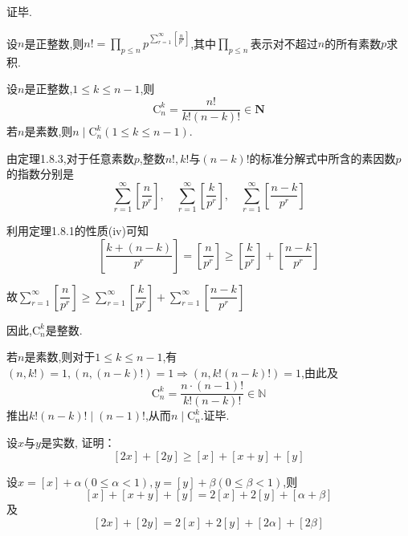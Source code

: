 证毕.

\corollary 设$n$是正整数,则$n !=\displaystyle{\prod_{p \leqslant n}} p^{\mathop{\sum}\limits_{r=1}^{\infty}\left[\frac{n}{p^{r}}\right]}$,其中$\displaystyle{\prod_{p \leqslant n}}$表示对不超过$n$的所有素数$p$求积.

\theorem {\color{red}[定理1.8.4]}设$n$是正整数,$1 \leqslant k \leqslant n-1$,则
\begin{equation}\label{equ1.29}
	\mathrm{C}_{n}^{k}=\frac{n !}{k !(n-k) !} \in \mathbf{N}
\end{equation}
若$n$是素数,则$n \mid \mathrm{C}_{n}^{k}(1 \leqslant k \leqslant n-1)$.

\proof 由定理1.8.3,对于任意素数$p$,整数$n !, k !$与$(n-k) !$的标准分解式中所含的素因数$p$的指数分别是
\begin{equation*}
	\sum_{r=1}^{\infty}\left[\frac{n}{p^{r}}\right], \quad \sum_{r=1}^{\infty}\left[\frac{k}{p^{r}}\right], \quad \sum_{r=1}^{\infty}\left[\frac{n-k}{p^{r}}\right]
\end{equation*}

利用定理1.8.1的性质(iv)可知
\begin{equation*}
	\left[\frac{k+(n-k)}{p^{r}}\right]=\left[\frac{n}{p^{r}}\right] \geqslant\left[\frac{k}{p^{r}}\right]+\left[\frac{n-k}{p^{r}}\right]
\end{equation*}

故$\displaystyle{\sum_{r=1}^{\infty}}\left[\dfrac{n}{p^{r}}\right] \geqslant \displaystyle{\sum_{r=1}^{\infty}}\left[\dfrac{k}{p^{r}}\right]+\displaystyle{\sum_{r=1}^{\infty}}\left[\dfrac{n-k}{p^{r}}\right]$

因此,$\mathrm{C}_{n}^{k}$是整数.

若$n$是素数,则对于$1 \leqslant k \leqslant n-1$,有$(n, k !)=1,(n,(n-k) !)=1 \Rightarrow(n, k !(n-k) !)=1$,由此及
\begin{equation*}
	\mathrm{C}_{n}^{k}=\frac{n \cdot(n-1) !}{k !(n-k) !} \in \mathbb{N}
\end{equation*}
推出$k !(n-k) ! \mid(n-1) !$,从而$n \mid \mathrm{C}_{n}^{k}$.证毕.

\example 设$x$与$y$是实数, 证明：
\begin{equation}\label{equ1.30}
	[2 x]+[2 y] \geqslant[x]+[x+y]+[y]
\end{equation}

\solve 设$x=[x]+\alpha(0 \leqslant \alpha<1), y=[y]+\beta(0 \leqslant \beta<1)$,则
\begin{equation}\label{equ1.31}
	[x]+[x+y]+[y]=2[x]+2[y]+[\alpha+\beta]
\end{equation}
及
\begin{equation}\label{equ1.32}
	[2 x]+[2 y]=2[x]+2[y]+[2 \alpha]+[2 \beta]
\end{equation}

